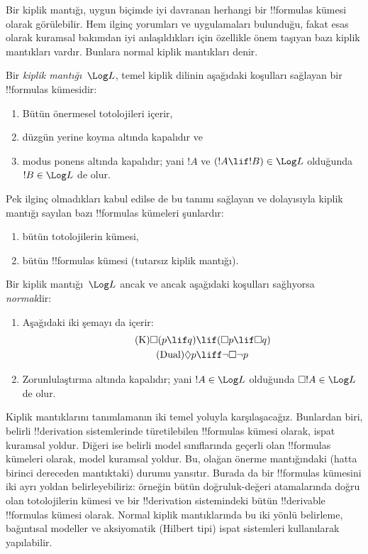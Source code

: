 \documentclass[../../../include/open-logic-section]{subfiles}
\begin{document}


Bir kiplik mantığı, uygun biçimde iyi davranan herhangi bir !!{formula}s
kümesi olarak görülebilir. Hem ilginç yorumları ve uygulamaları bulunduğu,
fakat esas olarak kuramsal bakımdan iyi anlaşıldıkları için özellikle önem
taşıyan bazı kiplik mantıkları vardır. Bunlara normal kiplik mantıkları denir.

\begin{defn}
Bir \emph{kiplik mantığı}~$\Log L$, temel kiplik dilinin aşağıdaki koşulları
sağlayan bir !!{formula}s kümesidir:
\begin{enumerate}
\item Bütün önermesel totolojileri içerir,
\item düzgün yerine koyma altında kapalıdır ve
\item modus ponens altında kapalıdır; yani $!A$ ve $(!A \lif
  !B) \in \Log L$ olduğunda $!B \in \Log L$ de olur.
\end{enumerate}
\end{defn}

\begin{ex}
Pek ilginç olmadıkları kabul edilse de bu tanımı sağlayan ve dolayısıyla
kiplik mantığı sayılan bazı !!{formula}s kümeleri şunlardır:
\begin{enumerate}
\item bütün totolojilerin kümesi,
\item bütün !!{formula}s kümesi (tutarsız kiplik mantığı).
\end{enumerate}
\end{ex}

\begin{defn}\label{defn:normal-modal-logic}
Bir kiplik mantığı~$\Log L$ ancak ve ancak aşağıdaki koşulları sağlıyorsa
\emph{normal}dir:
\begin{enumerate}
\item Aşağıdaki iki şemayı da içerir:
\begin{align}
\tag{K} \Box(p \lif q) & \lif (\Box p \lif \Box q) \\
\tag{Dual} \Diamond p & \liff \lnot \Box \lnot p
\end{align}
\item Zorunlulaştırma altında kapalıdır; yani $!A \in
  \Log L$ olduğunda $\Box !A \in \Log L$ de olur.
\end{enumerate}
\end{defn}

Kiplik mantıklarını tanımlamanın iki temel yoluyla karşılaşacağız. Bunlardan
biri, belirli !!{derivation} sistemlerinde türetilebilen !!{formula}s kümesi
olarak, ispat kuramsal yoldur. Diğeri ise belirli model sınıflarında geçerli
olan !!{formula}s kümeleri olarak, model kuramsal yoldur. Bu, olağan önerme
mantığındaki (hatta birinci dereceden mantıktaki) durumu yansıtır. Burada da
bir !!{formula}s kümesini iki ayrı yoldan belirleyebiliriz: örneğin bütün
doğruluk-değeri atamalarında doğru olan totolojilerin kümesi ve bir
!!{derivation} sistemindeki bütün !!{derivable} !!{formula}s kümesi olarak.
Normal kiplik mantıklarında bu iki yönlü belirleme, bağıntısal modeller ve
aksiyomatik (Hilbert tipi) ispat sistemleri kullanılarak yapılabilir.
\end{document}
